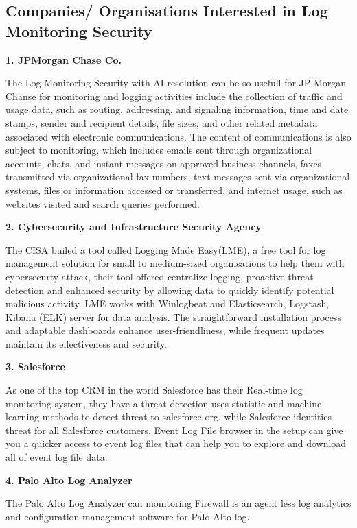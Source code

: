 \subsection{Companies/ Organisations Interested in Log Monitoring Security }

\textbf{1. JPMorgan Chase Co.}

The Log Monitoring Security with AI resolution can be so usefull for JP Morgan Chanse for monitoring and logging activities include the collection of traffic and usage data, such as routing, addressing, and signaling information, time and date stamps, sender and recipient details, file sizes, and other related metadata associated with electronic communications. The content of communications is also subject to monitoring, which includes emails sent through organizational accounts, chats, and instant messages on approved business channels, faxes transmitted via organizational fax numbers, text messages sent via organizational systems, files or information accessed or transferred, and internet usage, such as websites visited and search queries performed.


\textbf{2. Cybersecurity and Infrastructure Security Agency}

The CISA builed a tool called Logging Made Easy(LME), a free tool for log management solution for small to medium-sized organisations to help them with cybersecurty attack, their tool offered centralize logging, proactive threat detection and enhanced security by allowing data to quickly identify potential malicious activity. LME works with Winlogbeat and Elasticsearch, Logstash, Kibana (ELK) server for data analysis. The straightforward installation process and adaptable dashboards enhance user-friendliness, while frequent updates maintain its effectiveness and security\cite{cisaref}. 

\textbf{3. Salesforce}

As one of the top CRM in the world Salesforce has their Real-time log monitoring system, they have a threat detection uses statistic and machine learning methods to detect threat to salesforce org. while Salesforce identities threat for all Salesforce customers. Event Log File browser in the setup can give you a quicker access to event log files that can help you to explore and download all of event log file data\cite{saleforceref12}. 
 
\textbf{4. Palo Alto Log Analyzer}

The Palo Alto Log Analyzer can monitoring Firewall is an agent less log analytics and configuration management software for Palo Alto log.

